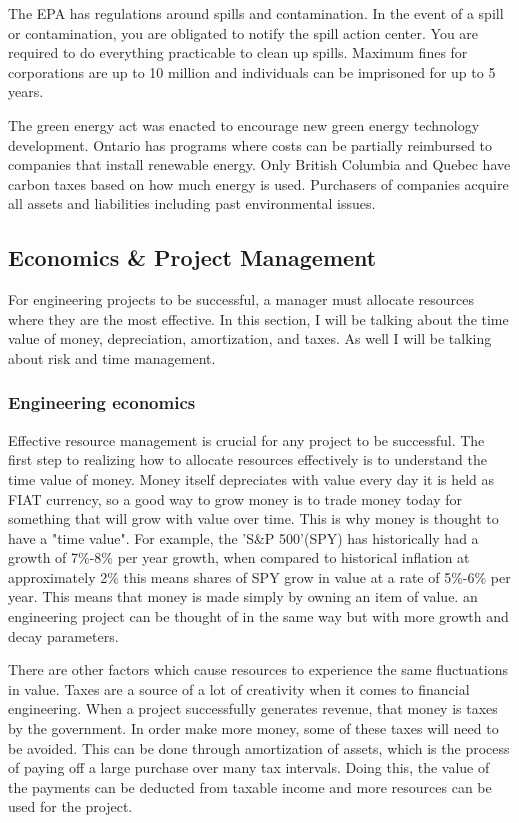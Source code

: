 \documentclass[12pt,a4paper]{report}
\begin{document}
    The EPA has regulations around spills and contamination. In the event of a spill or contamination, you are obligated to notify the spill action center. You are required to do everything practicable to clean up spills. Maximum fines for corporations are up to 10 million and individuals can be imprisoned for up to 5 years.\par
    
    The green energy act was enacted to encourage new green energy technology development. Ontario has programs where costs can be partially reimbursed to companies that install renewable energy. Only British Columbia and Quebec have carbon taxes based on how much energy is used. Purchasers of companies acquire all assets and liabilities including past environmental issues. 
    
    
    
    
\subsection{Economics \& Project Management}

For engineering projects to be successful, a manager must allocate resources where they are the most effective. In this section, I will be talking about the time value of money, depreciation, amortization, and taxes. As well I will be talking about risk and time management.

    \subsubsection{Engineering economics}
    
    Effective resource management is crucial for any project to be successful. The first step to realizing how to allocate resources effectively is to understand the time value of money. Money itself depreciates with value every day it is held as FIAT currency, so a good way to grow money is to trade money today for something that will grow with value over time. This is why money is thought to have a "time value". For example, the 'S\&P 500'(SPY) has historically had a growth of 7\%-8\% per year growth, when compared to historical inflation at approximately 2\% this means shares of SPY grow in value at a rate of 5\%-6\% per year. This means that money is made simply by owning an item of value. an engineering project can be thought of in the same way but with more growth and decay parameters.\par
    There are other factors which cause resources to experience the same fluctuations in value. Taxes are a source of a lot of creativity when it comes to financial engineering. When a project successfully generates revenue, that money is taxes by the government. In order make more money, some of these taxes will need to be avoided. This can be done through amortization of assets, which is the process of paying off a large purchase over many tax intervals. Doing this, the value of the payments can be deducted from taxable income and more resources can be used for the project.\par
    
\end{document}
